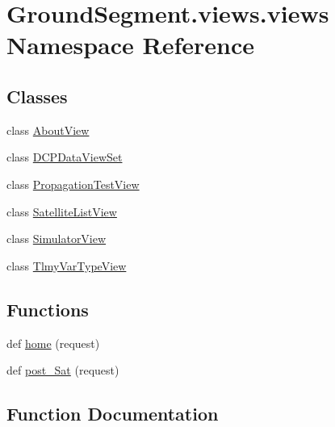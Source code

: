 \hypertarget{namespace_ground_segment_1_1views_1_1views}{}\section{Ground\+Segment.\+views.\+views Namespace Reference}
\label{namespace_ground_segment_1_1views_1_1views}
\subsection*{Classes}
\begin{DoxyCompactItemize}
\item 
class \hyperlink{class_ground_segment_1_1views_1_1views_1_1_about_view}{About\+View}
\item 
class \hyperlink{class_ground_segment_1_1views_1_1views_1_1_d_c_p_data_view_set}{D\+C\+P\+Data\+View\+Set}
\item 
class \hyperlink{class_ground_segment_1_1views_1_1views_1_1_propagation_test_view}{Propagation\+Test\+View}
\item 
class \hyperlink{class_ground_segment_1_1views_1_1views_1_1_satellite_list_view}{Satellite\+List\+View}
\item 
class \hyperlink{class_ground_segment_1_1views_1_1views_1_1_simulator_view}{Simulator\+View}
\item 
class \hyperlink{class_ground_segment_1_1views_1_1views_1_1_tlmy_var_type_view}{Tlmy\+Var\+Type\+View}
\end{DoxyCompactItemize}
\subsection*{Functions}
\begin{DoxyCompactItemize}
\item 
def \hyperlink{namespace_ground_segment_1_1views_1_1views_aeb321bb478897309fb36c4a511afee45}{home} (request)
\item 
def \hyperlink{namespace_ground_segment_1_1views_1_1views_af9de9ffb4d1f116d56bdefeca7d509fe}{post\+\_\+\+Sat} (request)
\end{DoxyCompactItemize}


\subsection{Function Documentation}
\hypertarget{namespace_ground_segment_1_1views_1_1views_aeb321bb478897309fb36c4a511afee45}{}
